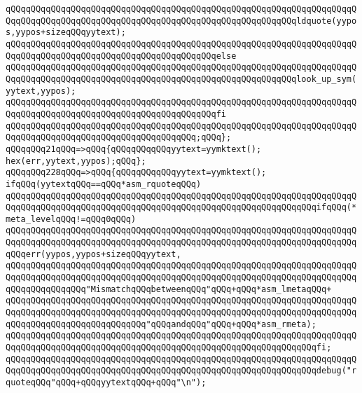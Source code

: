 \verb|qQQqqQQqqQQqqQQqqQQqqQQqqQQqqQQqqQQqqQQqqQQqqQQqqQQqqQQqqQQqqQQqqQQqqQQqqQQqqQQqqQQqqQQqqQQqqQQqqQQqqQQqqQQqqQQqqQQqqQQqqQQqqQQqldquote(yypos,yypos+sizeqQQqyytext);|\newline
\verb|qQQqqQQqqQQqqQQqqQQqqQQqqQQqqQQqqQQqqQQqqQQqqQQqqQQqqQQqqQQqqQQqqQQqqQQqqQQqqQQqqQQqqQQqqQQqqQQqqQQqqQQqqQQqqQQqelse|\newline
\verb|qQQqqQQqqQQqqQQqqQQqqQQqqQQqqQQqqQQqqQQqqQQqqQQqqQQqqQQqqQQqqQQqqQQqqQQqqQQqqQQqqQQqqQQqqQQqqQQqqQQqqQQqqQQqqQQqqQQqqQQqqQQqqQQqlook_up_sym(yytext,yypos);|\newline
\verb|qQQqqQQqqQQqqQQqqQQqqQQqqQQqqQQqqQQqqQQqqQQqqQQqqQQqqQQqqQQqqQQqqQQqqQQqqQQqqQQqqQQqqQQqqQQqqQQqqQQqqQQqqQQqqQQqfi|\newline
\verb|qQQqqQQqqQQqqQQqqQQqqQQqqQQqqQQqqQQqqQQqqQQqqQQqqQQqqQQqqQQqqQQqqQQqqQQqqQQqqQQqqQQqqQQqqQQqqQQqqQQqqQQqqQQq;qQQq};|\newline
\verb|qQQqqQQq21qQQq=>qQQq{qQQqqQQqqQQqyytext=yymktext();|\newline
\verb|hex(err,yytext,yypos);qQQq};|\newline
\verb|qQQqqQQq228qQQq=>qQQq{qQQqqQQqqQQqyytext=yymktext();|\newline
\verb|ifqQQq(yytextqQQq==qQQq*asm_rquoteqQQq)|\newline
\verb|qQQqqQQqqQQqqQQqqQQqqQQqqQQqqQQqqQQqqQQqqQQqqQQqqQQqqQQqqQQqqQQqqQQqqQQqqQQqqQQqqQQqqQQqqQQqqQQqqQQqqQQqqQQqqQQqqQQqqQQqqQQqqQQqqQQqifqQQq(*meta_levelqQQq!=qQQq0qQQq)|\newline
\verb|qQQqqQQqqQQqqQQqqQQqqQQqqQQqqQQqqQQqqQQqqQQqqQQqqQQqqQQqqQQqqQQqqQQqqQQqqQQqqQQqqQQqqQQqqQQqqQQqqQQqqQQqqQQqqQQqqQQqqQQqqQQqqQQqqQQqqQQqqQQqqQQqerr(yypos,yypos+sizeqQQqyytext,|\newline
\verb|qQQqqQQqqQQqqQQqqQQqqQQqqQQqqQQqqQQqqQQqqQQqqQQqqQQqqQQqqQQqqQQqqQQqqQQqqQQqqQQqqQQqqQQqqQQqqQQqqQQqqQQqqQQqqQQqqQQqqQQqqQQqqQQqqQQqqQQqqQQqqQQqqQQqqQQqqQQq"MismatchqQQqbetweenqQQq"qQQq+qQQq*asm_lmetaqQQq+|\newline
\verb|qQQqqQQqqQQqqQQqqQQqqQQqqQQqqQQqqQQqqQQqqQQqqQQqqQQqqQQqqQQqqQQqqQQqqQQqqQQqqQQqqQQqqQQqqQQqqQQqqQQqqQQqqQQqqQQqqQQqqQQqqQQqqQQqqQQqqQQqqQQqqQQqqQQqqQQqqQQqqQQqqQQqqQQq"qQQqandqQQq"qQQq+qQQq*asm_rmeta);|\newline
\verb|qQQqqQQqqQQqqQQqqQQqqQQqqQQqqQQqqQQqqQQqqQQqqQQqqQQqqQQqqQQqqQQqqQQqqQQqqQQqqQQqqQQqqQQqqQQqqQQqqQQqqQQqqQQqqQQqqQQqqQQqqQQqqQQqqQQqfi;|\newline
\verb|qQQqqQQqqQQqqQQqqQQqqQQqqQQqqQQqqQQqqQQqqQQqqQQqqQQqqQQqqQQqqQQqqQQqqQQqqQQqqQQqqQQqqQQqqQQqqQQqqQQqqQQqqQQqqQQqqQQqqQQqqQQqqQQqqQQqdebug("rquoteqQQq"qQQq+qQQqyytextqQQq+qQQq"\n");|\newline
